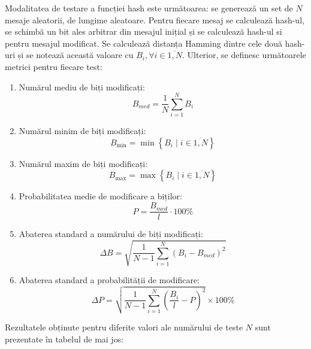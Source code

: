 Modalitatea de testare a funcției hash este următoarea: se generează un set de $N$ mesaje aleatorii, de lungime aleatoare.
Pentru fiecare mesaj se calculează hash-ul, se schimbă un bit ales arbitrar din mesajul inițial și se calculează hash-ul si pentru mesajul modificat.
Se calculează distanța Hamming dintre cele două hash-uri și se notează această valoare cu $B_i, \forall i \in \overline{1,N}$.
Ulterior, se definesc următoarele metrici pentru fiecare test:

\begin{enumerate}
    \item Numărul mediu de biți modificați:
    \begin{equation}
        B_{med} = \frac{1}{N} \sum_{i=1}^{N} B_i
    \end{equation}

    \item Numărul minim de biți modificați:
    \begin{equation}
        B_{\min} = \min \left\{ B_i \mid i \in \overline{1,N} \right\}
    \end{equation}

    \item Numărul maxim de biți modificați:
    \begin{equation}
        B_{\max} = \max \left\{ B_i \mid i \in \overline{1,N} \right\}
    \end{equation}

    \item Probabilitatea medie de modificare a biților:
    \begin{equation}
        P = \frac{B_{med}}{l} \cdot 100\%
    \end{equation}

    \item Abaterea standard a numărului de biți modificați:
    \begin{equation}
        \Delta B = \sqrt{\frac{1}{N-1} \sum_{i=1}^{N} \left( B_i - B_{med} \right)^2}
    \end{equation}

    \item Abaterea standard a probabilității de modificare:
    \begin{equation}
        \Delta P = \sqrt{\frac{1}{N-1} \sum_{i=1}^{N} \left( \frac{B_i}{l} - P \right)^2} \times 100\%
    \end{equation}
\end{enumerate}

Rezultatele obținute pentru diferite valori ale numărului de teste $N$ sunt prezentate în tabelul de mai jos:

